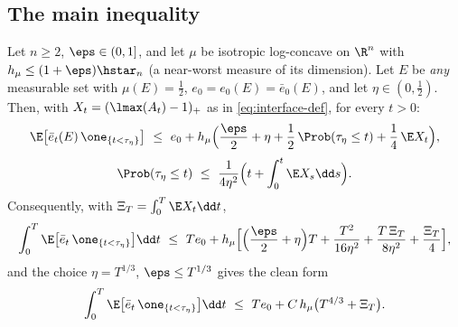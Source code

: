 \documentclass[../../main.tex]{subfiles}
\begin{document}
\subsection{The main inequality}

\begin{theorem}
\label{thm:bootstrap}
Let $n\ge2$, $\eps\in(0,1]$, and let $\mu$ be isotropic log-concave on $\R^n$ with
$h_\mu\le(1+\eps)\hstar_n$ (a near-worst measure of its dimension). Let $E$ be \emph{any}
measurable set with $\mu(E)=\tfrac12$, $e_0=e_0(E)=\bar e_0(E)$, and let $\eta\in(0,\tfrac12)$.
Then, with $X_t=(\lmax(A_t)-1)_+$ as in \eqref{eq:interface-def}, for every $t>0$:
\begin{equation}\label{eq:bootstrap-main}
  \E\bigl[\bar e_t(E)\,\one_{\{t<\tau_\eta\}}\bigr]
  \ \le\
  e_0+h_\mu\Bigl(\frac\eps2+\eta+\frac12\,\Prob(\tau_\eta\le t)+\frac14\,\E X_t\Bigr),
\end{equation}
\begin{equation}\label{eq:bootstrap-exit}
  \Prob(\tau_\eta\le t)\ \le\ \frac1{4\eta^2}\Bigl(t+\int_0^t\E X_s\dd s\Bigr).
\end{equation}
Consequently, with $\Xi_T=\int_0^T\E X_t\dd t$,
\begin{equation}\label{eq:bootstrap-integrated}
  \int_0^T\E\bigl[\bar e_t\,\one_{\{t<\tau_\eta\}}\bigr]\dd t
  \ \le\
  T e_0+h_\mu\Bigl[\Bigl(\frac\eps2+\eta\Bigr)T
  +\frac{T^2}{16\eta^2}+\frac{T\,\Xi_T}{8\eta^2}+\frac{\Xi_T}{4}\Bigr],
\end{equation}
and the choice $\eta=T^{1/3}$, $\eps\le T^{1/3}$ gives the clean form
\begin{equation}\label{eq:clean-form}
  \int_0^T\E\bigl[\bar e_t\,\one_{\{t<\tau_\eta\}}\bigr]\dd t
  \ \le\ Te_0+C\,h_\mu\bigl(T^{4/3}+\Xi_T\bigr).
\end{equation}
\end{theorem}
\end{document}
